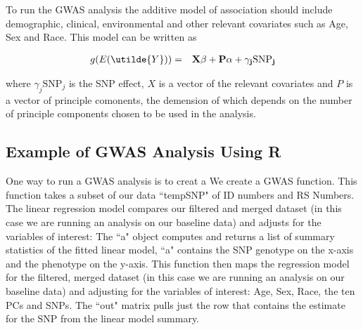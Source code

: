 \documentclass[11pt]{article}\usepackage[]{graphicx}\usepackage[]{color}
\begin{document}
To run the GWAS analysis the additive model of association should include demographic, clinical, environmental and other relevant covariates such as Age, Sex and Race. This model can be written as

\begin{eqnarray}
g(E(\utilde{Y})) &=& \bf{X} \bf{\beta} + \bf{P} \bf{\alpha} + \gamma _j \text{SNP} _j
\end{eqnarray}

where $\gamma _j \text{SNP} _j$ is the SNP effect, $X$ is a vector of the relevant covariates and $P$ is a vector of principle comonents, the demension of which depends on the number of principle components chosen to be used in the analysis.\\

\subsection{Example of GWAS Analysis Using R}

One way to run a GWAS analysis is to creat a We create a GWAS function. This function takes a subset of our data ``tempSNP" of ID numbers and RS Numbers. The linear regression model compares our filtered and merged dataset (in this case we are running an analysis on our baseline data) and adjusts for the variables of interest: 
The ``a" object computes and returns a list of summary statistics of the fitted linear model, ``a" contains the SNP genotype on the x-axis and the phenotype on the y-axis. This function then maps the regression model for the filtered, merged dataset (in this case we are running an analysis on our baseline data) and adjusting for the variables of interest: Age, Sex, Race, the ten PCs and SNPs. The ``out" matrix pulls just the row that contains the estimate for the SNP from the linear model summary. 
\end{document}
